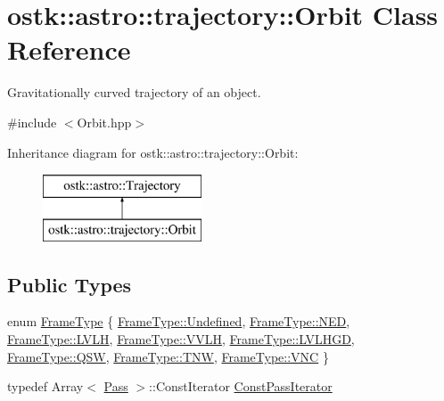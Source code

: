 \hypertarget{classostk_1_1astro_1_1trajectory_1_1_orbit}{}\section{ostk\+:\+:astro\+:\+:trajectory\+:\+:Orbit Class Reference}
\label{classostk_1_1astro_1_1trajectory_1_1_orbit}


Gravitationally curved trajectory of an object.  




{\ttfamily \#include $<$Orbit.\+hpp$>$}

Inheritance diagram for ostk\+:\+:astro\+:\+:trajectory\+:\+:Orbit\+:\begin{figure}[H]
\begin{center}
\leavevmode
\includegraphics[height=2.000000cm]{classostk_1_1astro_1_1trajectory_1_1_orbit}
\end{center}
\end{figure}
\subsection*{Public Types}
\begin{DoxyCompactItemize}
\item 
enum \hyperlink{classostk_1_1astro_1_1trajectory_1_1_orbit_a1cc449ad56374471a8ab4300dde979e7}{Frame\+Type} \{ \newline
\hyperlink{classostk_1_1astro_1_1trajectory_1_1_orbit_a1cc449ad56374471a8ab4300dde979e7aec0fc0100c4fc1ce4eea230c3dc10360}{Frame\+Type\+::\+Undefined}, 
\hyperlink{classostk_1_1astro_1_1trajectory_1_1_orbit_a1cc449ad56374471a8ab4300dde979e7acd3459b28418fa8fa75ffaba4f3e7c74}{Frame\+Type\+::\+N\+ED}, 
\hyperlink{classostk_1_1astro_1_1trajectory_1_1_orbit_a1cc449ad56374471a8ab4300dde979e7acdfe4a5ed313c123b78c17d455cfa94f}{Frame\+Type\+::\+L\+V\+LH}, 
\hyperlink{classostk_1_1astro_1_1trajectory_1_1_orbit_a1cc449ad56374471a8ab4300dde979e7ae01a717c5a8a11cf57f7fdcb96aedc9c}{Frame\+Type\+::\+V\+V\+LH}, 
\newline
\hyperlink{classostk_1_1astro_1_1trajectory_1_1_orbit_a1cc449ad56374471a8ab4300dde979e7a9f24a174bf2de776f4f87caef847746f}{Frame\+Type\+::\+L\+V\+L\+H\+GD}, 
\hyperlink{classostk_1_1astro_1_1trajectory_1_1_orbit_a1cc449ad56374471a8ab4300dde979e7a4f190ed692b3a94eb49da59c497c7f55}{Frame\+Type\+::\+Q\+SW}, 
\hyperlink{classostk_1_1astro_1_1trajectory_1_1_orbit_a1cc449ad56374471a8ab4300dde979e7a6d951949ba8af28fa54a8629ec0f8f17}{Frame\+Type\+::\+T\+NW}, 
\hyperlink{classostk_1_1astro_1_1trajectory_1_1_orbit_a1cc449ad56374471a8ab4300dde979e7ac6a33911cc53df9bdb84aac8d86a0565}{Frame\+Type\+::\+V\+NC}
 \}
\item 
typedef Array$<$ \hyperlink{classostk_1_1astro_1_1trajectory_1_1orbit_1_1_pass}{Pass} $>$\+::Const\+Iterator \hyperlink{classostk_1_1astro_1_1trajectory_1_1_orbit_a0873dc63f4453eb2c07447e2774e944f}{Const\+Pass\+Iterator}
\end{DoxyCompactItemize}
